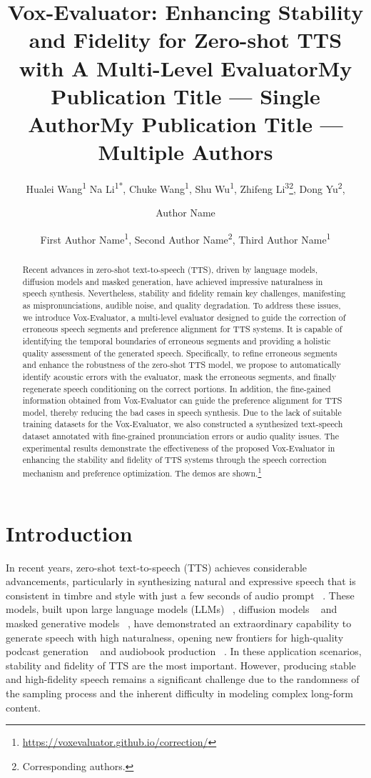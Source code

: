 \documentclass[letterpaper]{article} %
\title{Vox-Evaluator: Enhancing Stability and Fidelity for Zero-shot TTS with A Multi-Level Evaluator}
\author{
    Hualei Wang\textsuperscript{\rm 1 }
    Na Li\textsuperscript{\rm 1*},
    Chuke Wang\textsuperscript{\rm 1},
    Shu Wu\textsuperscript{\rm 1},
    Zhifeng Li\textsuperscript{\rm 3}\thanks{Corresponding authors.},
    Dong Yu\textsuperscript{\rm 2},
}
\title{My Publication Title --- Single Author}
\author {
    Author Name
}
\title{My Publication Title --- Multiple Authors}
\author {
    First Author Name\textsuperscript{\rm 1},
    Second Author Name\textsuperscript{\rm 2},
    Third Author Name\textsuperscript{\rm 1}
}
\begin{document}
\maketitle

\begin{abstract}
Recent advances in zero-shot text-to-speech (TTS), driven by language models, diffusion models and masked generation, have achieved impressive naturalness in speech synthesis. Nevertheless, stability and fidelity remain key challenges, manifesting as mispronunciations, audible noise, and quality degradation. To address these issues, we introduce Vox-Evaluator, a multi-level evaluator designed to guide the correction of erroneous speech segments and preference alignment for TTS systems. It is capable of identifying the temporal boundaries of erroneous segments and providing a holistic quality assessment of the generated speech.
Specifically, to refine erroneous segments and enhance the robustness of the zero-shot TTS model, we propose to automatically identify acoustic errors with the evaluator, mask the erroneous segments, and finally regenerate speech conditioning on the correct portions. In addition, the fine-gained information obtained from Vox-Evaluator can guide the preference alignment for TTS model, thereby reducing the bad cases in speech synthesis. Due to the lack of suitable training datasets for the Vox-Evaluator, we also constructed a synthesized text-speech dataset annotated with fine-grained pronunciation errors or audio quality issues. The experimental results demonstrate the effectiveness of the proposed Vox-Evaluator in enhancing the stability and fidelity of TTS systems through the speech correction mechanism and preference optimization. 
The demos are shown.\footnote{\url{https://voxevaluator.github.io/correction/}}
\end{abstract}

\section{Introduction}
In recent years, zero-shot text-to-speech (TTS) achieves considerable advancements, particularly in synthesizing natural and expressive speech that is consistent in timbre and style with just a few seconds of audio prompt ~\cite{borsos2023audiolm,kharitonov2023speak,chen2025neural}. These models, built upon large language models (LLMs) ~\cite{zhang2023speak,chen2024vall,lajszczak2024base,du2024cosyvoice}, diffusion models ~\cite{jiang2025sparse,anastassiou2024seed,eskimez2024e2} and masked generative models ~\cite{wang2024maskgct,ju2024naturalspeech}, have demonstrated an extraordinary capability to generate speech with high naturalness, opening new frontiers for high-quality podcast generation ~\cite{ju2025mooncast} and audiobook production ~\cite{park2025multiactor}. In these application scenarios, stability and fidelity of TTS are the most important. However, producing stable and high-fidelity speech remains a significant challenge due to the randomness of the sampling process and the inherent difficulty in modeling complex long-form content.
\end{document}

